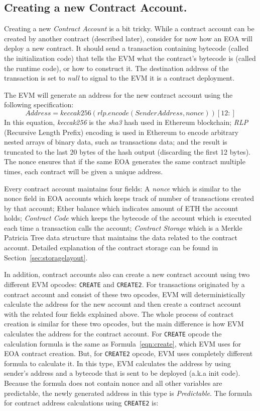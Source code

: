 \subsection{Creating a new Contract Account.}
Creating a new \textit{Contract Account} is a bit tricky. While a contract account can be created by another contract (described later), consider for now how an EOA will deploy a new contract. It should send a transaction containing bytecode (called the initialization code) that tells the EVM what the contract's bytecode is (called the runtime code), or how to construct it. The destination address of the transaction is set to \emph{null} to signal to the EVM it is a contract deployment. 

The EVM will generate an address for the new contract account using the following specification:
\begin{equation}
    \label{eqn:create}
    Address = keccak256(rlp.encode(Sender Address, nonce))[12:]
\end{equation}
In this equation, \textit{keccak256} is the \textit{sha3} hash used in Ethereum blockchain; \textit{RLP} (Recursive Length Prefix) encoding is used in Ethereum to encode arbitrary nested arrays of binary data, such as transactions data; and the result is truncated to the last 20 bytes of the hash output (discarding the first 12 bytes). The nonce ensures that if the same EOA generates the same contract multiple times, each contract will be given a unique address. 

Every contract account maintains four fields: A \textit{nonce} which is similar to the nonce field in EOA accounts which keeps track of number of transactions created by that account; Ether balance which indicates amount of ETH the account holds; \textit{Contract Code} which keeps the bytecode of the account which is executed each time a transaction calls the account; \textit{Contract Storage} which is a Merkle Patricia Tree data structure that maintains the data related to the contract account. Detailed explanation of the contract storage can be found in Section~\ref{sec:storagelayout}.

In addition, contract accounts also can create a new contract account using two different EVM opcodes: \texttt{CREATE} and \texttt{CREATE2}. For transactions originated by a contract account and consist of these two opcodes, EVM will deterministically calculate the address for the new account and then create a contract account with the related four fields explained above. The whole process of contract creation is similar for these two opcodes, but the main difference is how EVM calculates the address for the contract account. For \texttt{CREATE} opcode the calculation formula is the same as Formula~\ref{eqn:create}, which EVM uses for EOA contract creation. But, for \texttt{CREATE2} opcode, EVM uses completely different formula to calculate it. In this type, EVM calculates the address by using sender's address and a bytecode that is sent to be deployed (a.k.a init code). Because the formula does not contain nonce and all other variables are predictable, the newly generated address in this type is \emph{Predictable}. The formula for contract address calculations using \texttt{CREATE2} is:

